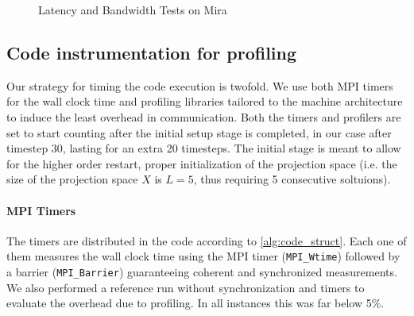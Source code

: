 \documentclass{sig-alternate}
\begin{document}
\begin{figure}
{  \label{fig:pingpong_titan}
  }
  \caption{Latency and Bandwidth Tests on Mira}
  \label{fig:pingpong}
\end{figure}

\subsection{Code instrumentation for profiling}
\label{sec:timers}
Our strategy for timing the code execution is twofold. We use both MPI timers
for the wall clock time and profiling libraries tailored to the machine
architecture to induce the least overhead in communication. Both the timers and
profilers are set to start counting after the initial setup stage is completed,
in our case after timestep 30, lasting for an extra 20 timesteps. The initial
stage is meant to allow for the higher order restart, proper initialization of the projection space (i.e. the size of the projection space $X$ is $L=5$, thus requiring 5 consecutive soltuions).
 
\paragraph{MPI Timers}
The timers are distributed in the code according to \ref{alg:code_struct}. Each one of them measures the wall
clock time using the MPI timer ({\tt MPI\_Wtime}) followed by a barrier
({\tt MPI\_Barrier}) guaranteeing coherent and synchronized measurements. We also performed a reference run without synchronization and timers to evaluate the overhead due to profiling. In all instances this was far
below 5\%. 
\end{document}
